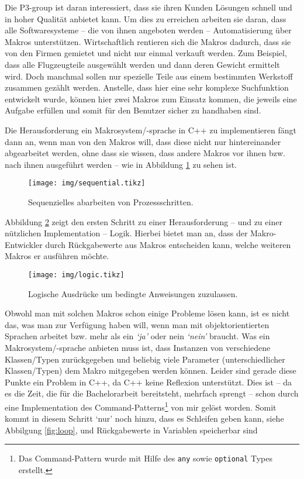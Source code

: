   Die P3-group ist daran interessiert, dass sie ihren Kunden Lösungen schnell und in hoher Qualität anbietet kann. Um dies zu erreichen arbeiten sie daran, dass alle Softwaresysteme -- die von ihnen angeboten werden -- Automatisierung über Makros unterstützen. Wirtschaftlich rentieren sich die Makros dadurch, dass sie von den Firmen gemietet und nicht nur einmal verkauft werden. Zum Beispiel, dass alle Flugzeugteile ausgewählt werden und dann deren Gewicht ermittelt wird. Doch manchmal sollen nur spezielle Teile aus einem bestimmten Werkstoff zusammen gezählt werden. Anstelle, dass hier eine sehr komplexe Suchfunktion entwickelt wurde, können hier zwei Makros zum Einsatz kommen, die jeweils eine Aufgabe erfüllen und somit für den Benutzer sicher zu handhaben sind.

  Die Herausforderung ein Makrosystem/-sprache in C++ zu implementieren fängt dann an, wenn man von den Makros will, dass diese nicht nur hintereinander abgearbeitet werden, ohne dass sie wissen, dass andere Makros vor ihnen bzw. nach ihnen ausgeführt werden -- wie in Abbildung \ref{fig:sequential} zu sehen ist.

  \begin{figure}[H]
    \centering
    \texttt{[image: img/sequential.tikz]}
    \caption{Sequenzielles abarbeiten von Prozessschritten.}
    \label{fig:sequential}
  \end{figure}

  Abbildung \ref{fig:logic} zeigt den ersten Schritt zu einer Herausforderung -- und zu einer nützlichen Implementation -- Logik. Hierbei bietet man an, dass der Makro-Entwickler durch Rückgabewerte aus Makros entscheiden kann, welche weiteren Makros er ausführen möchte.

  \begin{figure}[H]
    \centering
    \texttt{[image: img/logic.tikz]}
    \caption{Logische Ausdrücke um bedingte Anweisungen zuzulassen.}
    \label{fig:logic}
  \end{figure}

  Obwohl man mit solchen Makros schon einige Probleme lösen kann, ist es nicht das, was man zur Verfügung haben will, wenn man mit objektorientierten Sprachen arbeitet bzw. mehr als ein \textit{`ja'} oder nein \textit{`nein'} braucht. Was ein Makrosystem/-sprache anbieten muss ist, dass Instanzen von verschiedene Klassen/Typen zurückgegeben und beliebig viele Parameter (unterschiedlicher Klassen/Typen) dem Makro mitgegeben werden können. Leider sind gerade diese Punkte ein Problem in C++, da C++ keine Reflexion unterstützt. Dies ist -- da es die Zeit, die für die Bachelorarbeit bereitsteht, mehrfach sprengt -- schon durch eine Implementation des Command-Patterns\footnote{%
    Das Command-Pattern wurde mit Hilfe des \texttt{any}
    sowie \texttt{optional}
    Types erstellt.
  }\spewnotes{}
  von mir gelöst worden. Somit kommt in diesem Schritt `nur' noch hinzu, dass es Schleifen geben kann,  siehe Abbilgung \ref{fig:loop}, und Rückgabewerte in Variablen speicherbar sind

